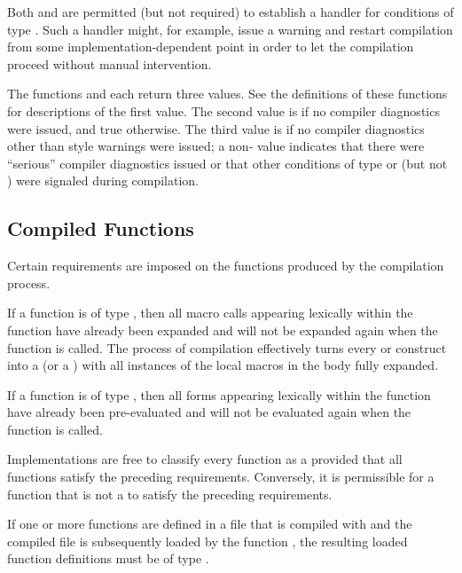 Both  and  are permitted (but not
    required) to establish a handler for conditions of type .
    Such a handler
    might, for example, issue a warning and restart compilation from some
    implementation-dependent point in order to let the compilation
    proceed without manual intervention.

The functions  and  each return three values.
See the definitions of these functions for descriptions of the first value.
    The second value is  if no compiler diagnostics were issued, and
    true otherwise.
    The third value is  if no compiler diagnostics other than style
    warnings were issued; a non- value indicates that there were 
    ``serious'' compiler diagnostics issued or that other conditions of
    type  or  (but not ) were signaled during
    compilation.


\subsection{Compiled Functions}

Certain requirements are imposed on the functions produced by the compilation
process.


If a function is of type , then
all macro calls appearing lexically within the function have 
        already been expanded and will not be expanded again when the
        function is called.  The process of
        compilation effectively turns every  or 
        construct into a  (or a ) with all
        instances of the local macros in the body fully expanded.

If a function is of type , then
all  forms appearing lexically within the function have
        already been pre-evaluated and will not be evaluated
        again when the function is called.
  
Implementations are free to classify every function as 
   a  provided that all functions
satisfy the preceding requirements.
Conversely, it is permissible for a function that is
      not a  to satisfy the preceding requirements.
  
If one or more functions are defined in a file that is compiled
      with  and the compiled file is subsequently loaded
by the function ,
the resulting loaded function definitions must be of
    type .
  
